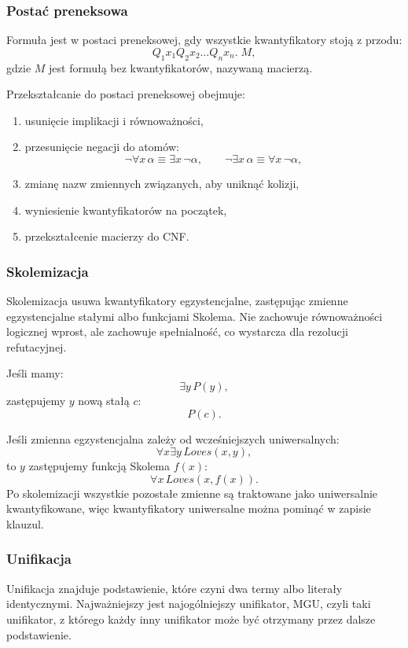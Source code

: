 \subsubsection{Postać preneksowa}

Formuła jest w postaci preneksowej, gdy wszystkie kwantyfikatory stoją z przodu:
\[
Q_1x_1Q_2x_2\dots Q_nx_n.\; M,
\]
gdzie $M$ jest formułą bez kwantyfikatorów, nazywaną macierzą.

Przekształcanie do postaci preneksowej obejmuje:
\begin{enumerate}
  \item usunięcie implikacji i równoważności,
  \item przesunięcie negacji do atomów:
  \[
  \neg\forall x\,\alpha \equiv \exists x\,\neg\alpha,\qquad
  \neg\exists x\,\alpha \equiv \forall x\,\neg\alpha,
  \]
  \item zmianę nazw zmiennych związanych, aby uniknąć kolizji,
  \item wyniesienie kwantyfikatorów na początek,
  \item przekształcenie macierzy do CNF.
\end{enumerate}

\subsubsection{Skolemizacja}

Skolemizacja usuwa kwantyfikatory egzystencjalne, zastępując zmienne egzystencjalne stałymi albo funkcjami Skolema. Nie zachowuje równoważności logicznej wprost, ale zachowuje spełnialność, co wystarcza dla rezolucji refutacyjnej.

Jeśli mamy:
\[
\exists y\, P(y),
\]
zastępujemy $y$ nową stałą $c$:
\[
P(c).
\]

Jeśli zmienna egzystencjalna zależy od wcześniejszych uniwersalnych:
\[
\forall x\exists y\, Loves(x,y),
\]
to $y$ zastępujemy funkcją Skolema $f(x)$:
\[
\forall x\, Loves(x,f(x)).
\]
Po skolemizacji wszystkie pozostałe zmienne są traktowane jako uniwersalnie kwantyfikowane, więc kwantyfikatory uniwersalne można pominąć w zapisie klauzul.

\subsubsection{Unifikacja}

Unifikacja znajduje podstawienie, które czyni dwa termy albo literały identycznymi. Najważniejszy jest najogólniejszy unifikator, MGU, czyli taki unifikator, z którego każdy inny unifikator może być otrzymany przez dalsze podstawienie.

